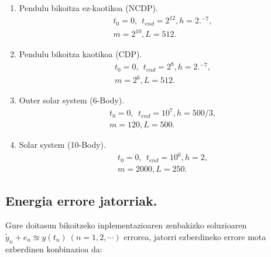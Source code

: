 \begin{enumerate}
\item Pendulu bikoitza ez-kaotikoa (NCDP).
\begin{align*}
& t_0=0, \ \ t_{end}=2^{12}, h=2.^{-7}, \\
& m=2^{10}, L=512.
\end{align*} 

\item Pendulu bikoitza kaotikoa (CDP).
\begin{align*}
& t_0=0, \ \ t_{end}=2^{8}, h=2.^{-7}, \\
& m=2^6, L=512.
\end{align*} 

\item Outer solar system (6-Body).
\begin{align*}
& t_0=0, \ \ t_{end}=10^{7}, h=500/3, \\
& m=120, L=500.
\end{align*} 

\item Solar system (10-Body).
\begin{align*}
& t_0=0, \ \ t_{end}=10^{6}, h=2, \\
& m=2000, L=250.
\end{align*} 

\end{enumerate}

\subsection{Energia errore jatorriak.}

Gure doitasun bikoitzeko inplementazioaren zenbakizko soluzioaren $\tilde{y}_n+e_n \approxeq y(t_n) \ (n=1,2,\cdots)$ errorea, jatorri ezberdineko errore mota ezberdinen konbinazioa da:

